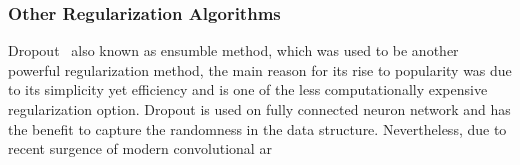 \subsubsection{Other Regularization Algorithms}

Dropout~\cite{JMLR:v15:srivastava14a} also known as ensumble method, which was used to be another powerful regularization method, the main reason for its rise to popularity was due to its simplicity yet efficiency and is one of the less computationally expensive regularization option. Dropout is used on fully connected neuron network and has the benefit to capture the randomness in the data structure. Nevertheless, due to recent surgence of modern convolutional ar
